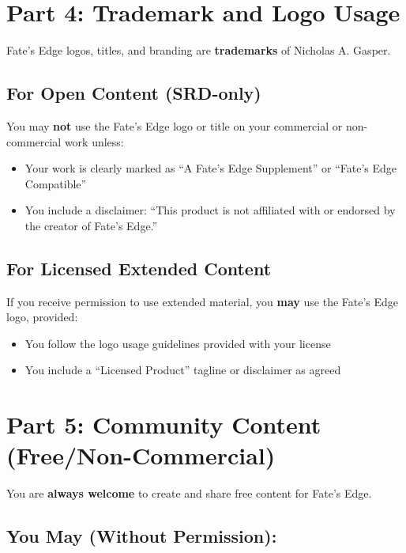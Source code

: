 \documentclass[11pt]{article}
\begin{document}
\section*{Part 4: Trademark and Logo Usage}

Fate's Edge logos, titles, and branding are \textbf{trademarks} of Nicholas A. Gasper.

\subsection*{For Open Content (SRD-only)}

You may \textbf{not} use the Fate's Edge logo or title on your commercial or non-commercial work unless:

\begin{itemize}[leftmargin=*, itemsep=2pt]
  \item Your work is clearly marked as ``A Fate's Edge Supplement'' or ``Fate's Edge Compatible''
  \item You include a disclaimer: ``This product is not affiliated with or endorsed by the creator of Fate's Edge.''
\end{itemize}

\subsection*{For Licensed Extended Content}

If you receive permission to use extended material, you \textbf{may} use the Fate's Edge logo, provided:

\begin{itemize}[leftmargin=*, itemsep=2pt]
  \item You follow the logo usage guidelines provided with your license
  \item You include a ``Licensed Product'' tagline or disclaimer as agreed
\end{itemize}

\section*{Part 5: Community Content (Free/Non-Commercial)}

You are \textbf{always welcome} to create and share free content for Fate's Edge.

\subsection*{You May (Without Permission):}
\end{document}
